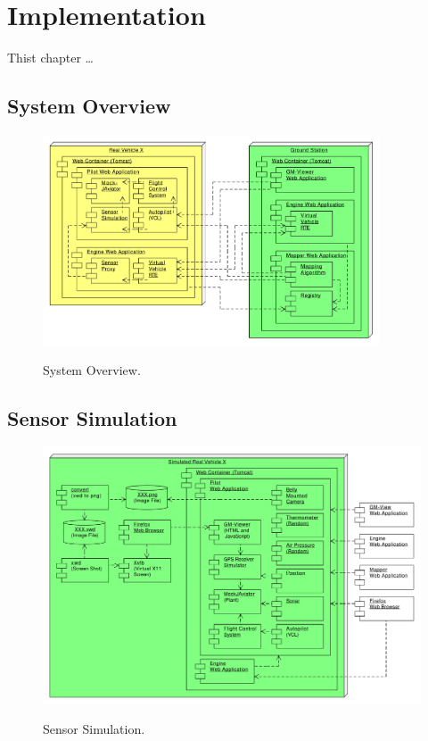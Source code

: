 
\chapter{Implementation}

Thist chapter \ldots

\section{System Overview}
\begin{figure}[h]
	\begin{center}
		{\includegraphics[width=10cm]{SystemOverview.pdf}}
	\end{center}
	\caption{System Overview.\label{fig:SystemOverview}}
\end{figure}


\section{Sensor Simulation}

\begin{figure}[h]
	\begin{center}
		{\includegraphics[width=11.6cm]{SensorSimulation-3.pdf}}
	\end{center}
	\caption{Sensor Simulation.\label{fig:SensorSimulation}}
\end{figure}


